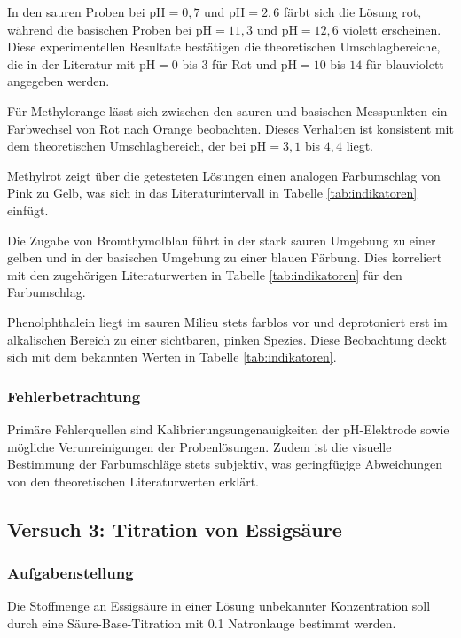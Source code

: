 In den sauren Proben bei $\text{pH} = 0{,}7$ und $\text{pH} = 2{,}6$ färbt sich die Lösung rot, während die basischen Proben bei $\text{pH} = 11{,}3$ und $\text{pH} = 12{,}6$ violett erscheinen.
Diese experimentellen Resultate bestätigen die theoretischen Umschlagbereiche, die in der Literatur mit $\text{pH} = 0$ bis $3$ für Rot und $\text{pH} = 10$ bis $14$ für blauviolett angegeben werden. \cite{mortimer_muller} \newline

Für Methylorange lässt sich zwischen den sauren und basischen Messpunkten ein Farbwechsel von Rot nach Orange beobachten.
Dieses Verhalten ist konsistent mit dem theoretischen Umschlagbereich, der bei $\text{pH} = 3{,}1$ bis $4{,}4$ liegt. \newline


Methylrot zeigt über die getesteten Lösungen einen analogen Farbumschlag von Pink zu Gelb, was sich in das Literaturintervall in Tabelle \ref{tab:indikatoren} einfügt. \cite{mortimer_muller}\newline

Die Zugabe von Bromthymolblau führt in der stark sauren Umgebung zu einer gelben und in der basischen Umgebung zu einer blauen Färbung.
Dies korreliert mit den zugehörigen Literaturwerten in Tabelle \ref{tab:indikatoren} für den Farbumschlag. \cite{mortimer_muller}\newline


Phenolphthalein liegt im sauren Milieu stets farblos vor und deprotoniert erst im alkalischen Bereich zu einer sichtbaren, pinken Spezies.
Diese Beobachtung deckt sich mit dem bekannten Werten in Tabelle \ref{tab:indikatoren}. \cite{mortimer_muller}

\subsubsection{Fehlerbetrachtung}

Primäre Fehlerquellen sind Kalibrierungsungenauigkeiten der pH-Elektrode sowie mögliche Verunreinigungen der Probenlösungen. Zudem ist die visuelle Bestimmung der Farbumschläge stets subjektiv, was geringfügige Abweichungen von den theoretischen Literaturwerten erklärt.

\subsection{Versuch 3: Titration von Essigsäure}
\subsubsection{Aufgabenstellung}
Die Stoffmenge an Essigsäure in einer Lösung unbekannter Konzentration soll durch eine Säure-Base-Titration mit \SI{0,1}{} Natronlauge bestimmt werden.

